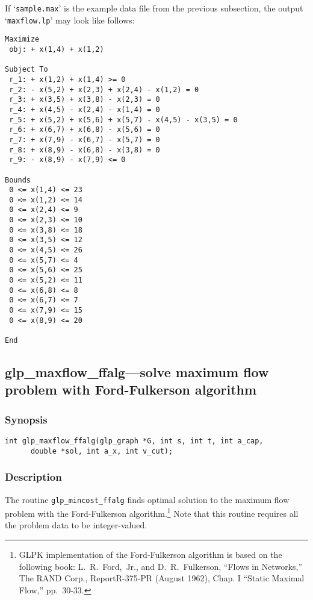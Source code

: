 \documentclass[dvipdfm,11pt]{report}
\begin{document}
If `\verb|sample.max|' is the example data file from the previous
subsection, the output `\verb|maxflow.lp|' may look like follows:

\begin{footnotesize}
\begin{verbatim}
Maximize
 obj: + x(1,4) + x(1,2)

Subject To
 r_1: + x(1,2) + x(1,4) >= 0
 r_2: - x(5,2) + x(2,3) + x(2,4) - x(1,2) = 0
 r_3: + x(3,5) + x(3,8) - x(2,3) = 0
 r_4: + x(4,5) - x(2,4) - x(1,4) = 0
 r_5: + x(5,2) + x(5,6) + x(5,7) - x(4,5) - x(3,5) = 0
 r_6: + x(6,7) + x(6,8) - x(5,6) = 0
 r_7: + x(7,9) - x(6,7) - x(5,7) = 0
 r_8: + x(8,9) - x(6,8) - x(3,8) = 0
 r_9: - x(8,9) - x(7,9) <= 0

Bounds
 0 <= x(1,4) <= 23
 0 <= x(1,2) <= 14
 0 <= x(2,4) <= 9
 0 <= x(2,3) <= 10
 0 <= x(3,8) <= 18
 0 <= x(3,5) <= 12
 0 <= x(4,5) <= 26
 0 <= x(5,7) <= 4
 0 <= x(5,6) <= 25
 0 <= x(5,2) <= 11
 0 <= x(6,8) <= 8
 0 <= x(6,7) <= 7
 0 <= x(7,9) <= 15
 0 <= x(8,9) <= 20

End
\end{verbatim}
\end{footnotesize}

\subsection{glp\_maxflow\_ffalg---solve maximum flow problem with
Ford-Fulkerson algorithm}

\subsubsection*{Synopsis}

\begin{verbatim}
int glp_maxflow_ffalg(glp_graph *G, int s, int t, int a_cap,
      double *sol, int a_x, int v_cut);
\end{verbatim}

\subsubsection*{Description}

The routine \verb|glp_mincost_ffalg| finds optimal solution to the
maximum flow problem with the Ford-Fulkerson algorithm.\footnote{GLPK
implementation of the Ford-Fulkerson algorithm is based on the following
book: L.~R.~Ford,~Jr., and D.~R.~Fulkerson, ``Flows in Networks,'' The
RAND Corp., Report\linebreak R-375-PR (August 1962), Chap. I
``Static Maximal Flow,'' pp.~30-33.} Note that this routine requires all
the problem data to be integer-valued.
\end{document}
